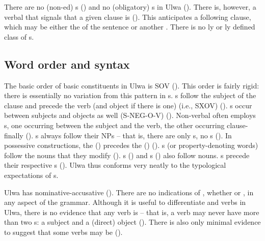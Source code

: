 There are no (non-ed) s () and no (obligatory) s in Ulwa (). There is, however, a verbal  that signals that a given clause is  (). This  anticipates a following clause, which may be either the  of the sentence or another . There is no ly or ly defined class of s.



\subsection{Word order and syntax}\label{sec:1.8.3}



The  basic order of basic constituents in Ulwa is SOV (). This order is fairly rigid: there is essentially no variation from this pattern in  s.  s follow the subject of the clause and precede the verb (and object if there is one) (i.e., SXOV) (). s occur between subjects and objects as well (S-NEG-O-V) (). Non-verbal   often employs s, one occurring between the subject and the verb, the other occurring clause-finally (). s always follow their NPs -- that is, there are only s, no s (). In  possessive constructions, the  () precedes the  () (). s (or property-denoting words) follow the nouns that they modify (). s () and s () also follow nouns. s precede their respective s (). Ulwa thus conforms very neatly to the typological expectations of s.


Ulwa has nominative-accusative  (). There are no indications of , whether  or  , in any aspect of the grammar. Although it is useful to differentiate  and  verbs in Ulwa, there is no evidence that any verb is  -- that is, a verb may never have more than two s: a subject and a  (direct) object (). There is also only minimal evidence to suggest that some verbs may be  ().

